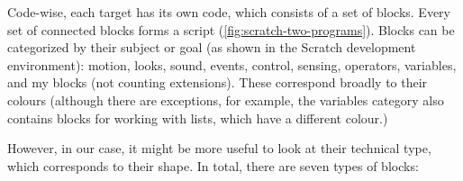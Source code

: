 \documentclass[../main]{subfiles}
\begin{document}
Code-wise, each target has its own code, which consists of a set of blocks.
Every set of connected blocks forms a script (\cref{fig:scratch-two-programs}).
Blocks can be categorized by their subject or goal (as shown in the Scratch development environment): \textcolor{scrmove}{motion}, \textcolor{scrlook}{looks}, \textcolor{scrsound}{sound}, \textcolor{screvent}{events}, \textcolor{scrcontrol}{control}, \textcolor{scrsensing}{sensing}, \textcolor{scroperator}{operators}, \textcolor{scrvariable}{variables}, and \textcolor{scrmoreblocks}{my blocks} (not counting extensions).
These correspond broadly to their colours (although there are exceptions, for example, the \textcolor{scrvariable}{variables} category also contains blocks for working with lists, which have a different colour.)

However, in our case, it might be more useful to look at their technical type, which corresponds to their shape.
In total, there are seven types of blocks:
\end{document}
